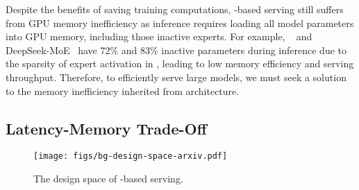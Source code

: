 Despite the benefits of saving training computations, \MoE-based \LLM serving still suffers from GPU memory inefficiency as \MoE inference requires loading all model parameters into GPU memory, including those inactive experts. 
%
For example, \mixtral~\cite{jiang2024mixtral} and DeepSeek-MoE~\cite{dai2024deepseekmoe} have 72\% and 83\% inactive parameters during inference due to the sparsity of expert activation in \MoE, leading to low memory efficiency and serving throughput. 
%
Therefore, to efficiently serve large \MoE models, we must seek a solution to the memory inefficiency inherited from \MoE architecture.

\subsection{Latency-Memory Trade-Off
}
\label{subsec:bg-latency-memory-tradeoff}






\begin{figure}[t]
  \centering
  \texttt{[image: figs/bg-design-space-arxiv.pdf]}
  \vspace{-0.1in}
  \caption{The design space of \MoE-based \LLM serving.}
  \vspace{-0.2in}
  \label{fig:bg-design-space}
\end{figure}




